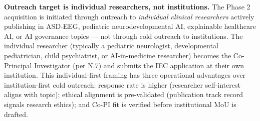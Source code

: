 \noindent\textbf{Outreach target is individual researchers, not institutions.} The Phase 2 acquisition is initiated through outreach to \emph{individual clinical researchers} actively publishing in ASD-EEG, pediatric neurodevelopmental AI, explainable healthcare AI, or AI governance topics --- not through cold outreach to institutions. The individual researcher (typically a pediatric neurologist, developmental pediatrician, child psychiatrist, or AI-in-medicine researcher) becomes the Co-Principal Investigator (per N.7) and submits the IEC application at their own institution. This individual-first framing has three operational advantages over institution-first cold outreach: response rate is higher (researcher self-interest aligns with topic); ethical alignment is pre-validated (publication track record signals research ethics); and Co-PI fit is verified before institutional MoU is drafted.


